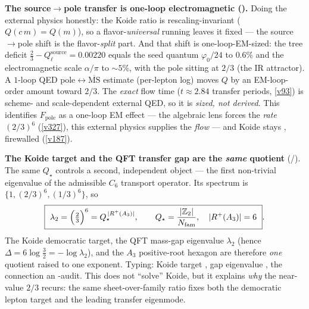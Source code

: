 \documentclass[11pt,a4paper]{article}
\newcommand{\Nfam}{N_{\mathrm{fam}}}
\newcommand{\Z}{\mathbb{Z}}
\begin{document}
\par\smallskip\noindent\textbf{The source$\to$pole transfer is one-loop electromagnetic
().} Doing the external physics honestly: the Koide ratio is
rescaling-invariant ($Q(c\,m)=Q(m)$), so a flavor-\emph{universal} running leaves it fixed --- the
source$\to$pole shift is the flavor-\emph{split} part. And that shift is one-loop-EM-sized: the tree
deficit $\tfrac23-Q_\ell^{\mathrm{source}}=0.00220$ equals the seed quantum $\varphi_0/24$ to $0.6\%$ and
the electromagnetic scale $\alpha/\pi$ to ${\sim}5\%$, with the pole sitting at $2/3$ (the IR attractor).
A $1$-loop QED $\mathrm{pole}\!\leftrightarrow\!\overline{\mathrm{MS}}$ estimate (per-lepton log) moves $Q$
by an EM-loop-order amount toward $2/3$. The \emph{exact} flow time ($t\approx2.84$ transfer periods,
\vref{v93}) is scheme- and scale-dependent external QED, so it is \emph{sized, not derived}. This
identifies $F_{\mathrm{pole}}$ as a one-loop EM effect --- the algebraic lens forces the \emph{rate}
$(2/3)^6$ (\vref{v327}), this external physics supplies the \emph{flow} --- and Koide stays \mC,
firewalled (\vref{v187}).

\par\smallskip\noindent\textbf{The Koide target and the QFT transfer gap are the \emph{same} quotient} (\mE/\mC).
The same $Q_\star$ controls a second, independent object --- the first non-trivial eigenvalue of the
admissible $C_6$ transport operator. Its spectrum is $\{1,(2/3)^6,(1/3)^6\}$, so
\[
  \boxed{\ \lambda_2=\Bigl(\tfrac23\Bigr)^6=Q_\star^{\,|R^+(A_3)|},\qquad Q_\star=\frac{|\Z_2|}{\Nfam},\quad |R^+(A_3)|=6\ }.
\]
The Koide democratic target, the QFT mass-gap eigenvalue $\lambda_2$ (hence $\Delta=6\log\tfrac32=-\log\lambda_2$),
and the $A_3$ positive-root hexagon are therefore \emph{one} quotient raised to one exponent. Typing:
Koide target \mC, gap eigenvalue \mE, the connection an \mE-audit. This does not ``solve'' Koide, but it
explains \emph{why} the near-value $2/3$ recurs: the same sheet-over-family ratio fixes both the
democratic lepton target and the leading transfer eigenmode.
\end{document}
